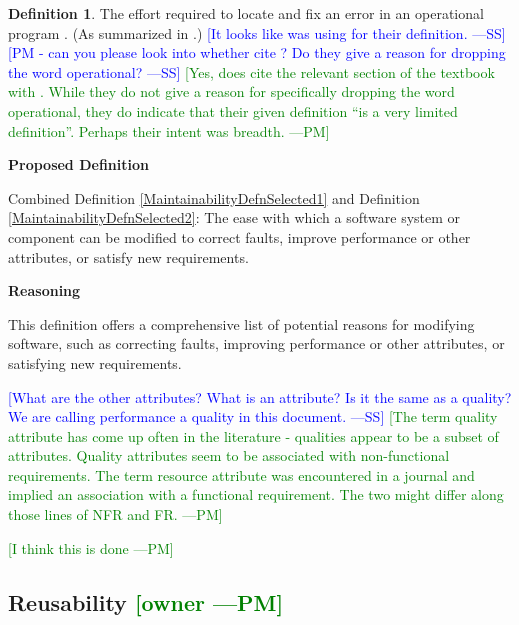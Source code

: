 \documentclass[letterpaper,cleveref]{lipics-v2019}
\newcommand{\authornote}[3]{\textcolor{#1}{[#3 ---#2]}}
\newcommand{\authornote}[3]{}
\newcommand{\wss}[1]{\authornote{blue}{SS}{#1}} %
\newcommand{\pmi}[1]{\authornote{green}{PM}{#1}} %
\theoremstyle{definition}
\newtheorem{defn}{Definition}
\begin{document}
\begin{defn}
  The effort required to locate and fix an error in an operational program
  \citep{McCallEtAl1977}. (As summarized in \citet{VanVliet2000}.) \wss{It looks
    like \citet{pressman2005software} was using \citet{McCallEtAl1977} for their
    definition.} \wss{PM - can you please look into whether
    \citet{pressman2005software} cite \citet{McCallEtAl1977}?  Do they give a
    reason for dropping the word operational?}
\pmi{Yes, \citet{pressman2005software} does cite the relevant section of the textbook with \citet{McCallEtAl1977}. While they do not give a reason for specifically dropping the word operational, they do indicate that their given definition ``is a very limited definition''. Perhaps their intent was breadth.}
\end{defn}

\noindent \textbf{Proposed Definition}

Combined Definition \ref{MaintainabilityDefnSelected1} and Definition
\ref{MaintainabilityDefnSelected2}: The ease with which a software system or
component can be modified to correct faults, improve performance or other
attributes, or satisfy new requirements.

\noindent \textbf{Reasoning}

This definition offers a comprehensive list of potential reasons for modifying software, such as correcting faults, improving performance or other attributes, or satisfying new requirements.

 \wss{What are the other attributes?  What is an attribute?  Is it the
  same as a quality?  We are calling performance a quality in this document.}
\pmi{The term quality attribute has come up often in the literature - qualities appear to be a subset of attributes. Quality attributes seem to be associated with non-functional requirements. The term resource attribute was encountered in a journal and implied an association with a functional requirement. The two might differ along those lines of NFR and FR.}

\pmi{I think this is done}

\subsection{{Reusability} \pmi{owner}}
\end{document}
